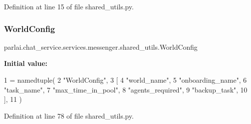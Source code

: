 Definition at line 15 of file shared\+\_\+utils.\+py.

\mbox{\label{namespaceparlai_1_1chat__service_1_1services_1_1messenger_1_1shared__utils_a2fad0a70ab62b27b2692978de3a852f1}} 
\subsubsection{\texorpdfstring{World\+Config}{WorldConfig}}
{\footnotesize\ttfamily parlai.\+chat\+\_\+service.\+services.\+messenger.\+shared\+\_\+utils.\+World\+Config}

{\bfseries Initial value\+:}
\begin{DoxyCode}
1 =  namedtuple(
2     \textcolor{stringliteral}{"WorldConfig"},
3     [
4         \textcolor{stringliteral}{"world\_name"},
5         \textcolor{stringliteral}{"onboarding\_name"},
6         \textcolor{stringliteral}{"task\_name"},
7         \textcolor{stringliteral}{"max\_time\_in\_pool"},
8         \textcolor{stringliteral}{"agents\_required"},
9         \textcolor{stringliteral}{"backup\_task"},
10     ],
11 )
\end{DoxyCode}


Definition at line 78 of file shared\+\_\+utils.\+py.

